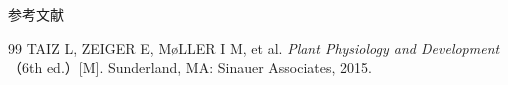 \documentclass[aspectratio=169,10pt,fontset=fandol]{ctexbeamer}
\begin{document}
\begin{frame}[t,fragile]{参考文献}
\normalsize
{\normalsize
\begin{thebibliography}{99}
 TAIZ L, ZEIGER E, M{\o}LLER I M, et al. \emph{Plant Physiology and Development}（6th ed.）[M]. Sunderland, MA: Sinauer Associates, 2015.
\end{thebibliography}
}
\end{frame}
\end{document}
